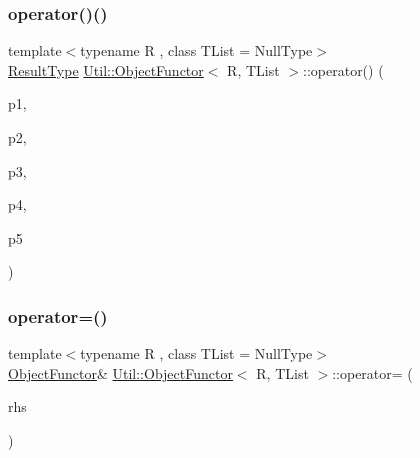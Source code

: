 \subsubsection{\texorpdfstring{operator()()}{operator()()}\hspace{0.1cm}{\footnotesize\ttfamily [18/18]}}
{\footnotesize\ttfamily template$<$typename R , class T\+List  = Null\+Type$>$ \\
\mbox{\hyperlink{classUtil_1_1ObjectFunctor_a77f816e98108848347d0dfc085090a1c}{Result\+Type}} \mbox{\hyperlink{classUtil_1_1ObjectFunctor}{Util\+::\+Object\+Functor}}$<$ R, T\+List $>$\+::operator() (\begin{DoxyParamCaption}\item[{\mbox{\hyperlink{classUtil_1_1ObjectFunctor_a199715d28029627c2ae7219c13b04d26}{Parm1}}}]{p1,  }\item[{\mbox{\hyperlink{classUtil_1_1ObjectFunctor_a6809cf65883dc7575e01d9b9849649cf}{Parm2}}}]{p2,  }\item[{\mbox{\hyperlink{classUtil_1_1ObjectFunctor_a6becd26610c6091b9ba93cd96f3def66}{Parm3}}}]{p3,  }\item[{\mbox{\hyperlink{classUtil_1_1ObjectFunctor_a54ce0b64981cd7f558ce8eea7df3f1b2}{Parm4}}}]{p4,  }\item[{\mbox{\hyperlink{classUtil_1_1ObjectFunctor_a8428e04dd3fb91bc7f7c518a1771eecb}{Parm5}}}]{p5 }\end{DoxyParamCaption})\hspace{0.3cm}{\ttfamily [inline]}}

\mbox{\label{classUtil_1_1ObjectFunctor_a90395c8be24965e154bee2f7813a78e8}} 
\subsubsection{\texorpdfstring{operator=()}{operator=()}\hspace{0.1cm}{\footnotesize\ttfamily [1/3]}}
{\footnotesize\ttfamily template$<$typename R , class T\+List  = Null\+Type$>$ \\
\mbox{\hyperlink{classUtil_1_1ObjectFunctor}{Object\+Functor}}\& \mbox{\hyperlink{classUtil_1_1ObjectFunctor}{Util\+::\+Object\+Functor}}$<$ R, T\+List $>$\+::operator= (\begin{DoxyParamCaption}\item[{const \mbox{\hyperlink{classUtil_1_1ObjectFunctor}{Object\+Functor}}$<$ R, T\+List $>$ \&}]{rhs }\end{DoxyParamCaption})\hspace{0.3cm}{\ttfamily [inline]}}

